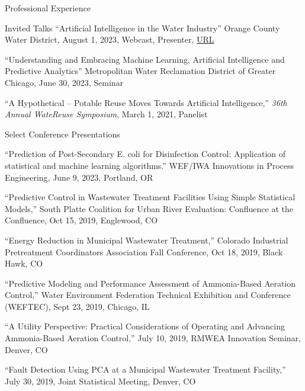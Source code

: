 \documentclass{resume} %
\begin{document}
\begin{rSection}{Professional Experience}
\begin{rSection}{Invited Talks}
``Artificial Intelligence in the Water Industry'' Orange County Water District, August 1, 2023, Webcast, Presenter, \href{https://www.youtube.com/watch?v=M3AQTs5iN5g&list=PLUMrNJO9gBM-7WWzJmBveXSQWbOXrLBDg}{URL}

``Understanding and Embracing Machine Learning, Artificial Intelligence and Predictive Analytics'' Metropolitan Water Reclamation District of Greater Chicago, June 30, 2023, Seminar

``A Hypothetical – Potable Reuse Moves Towards Artificial Intelligence,'' \emph{36th Annual WateReuse Symposium}, March 1, 2021, Panelist

\end{rSection}



\begin{rSection}{Select Conference Presentations}

``Prediction of Post-Secondary E. coli for Disinfection Control: Application of statistical and machine learning algorithms.'' WEF/IWA Innovations in Process Engineering, June 9, 2023, Portland, OR

``Predictive Control in Wastewater Treatment Facilities Using Simple Statistical Models,'' South Platte Coalition for Urban River Evaluation: Confluence at the Confluence, Oct 15, 2019, Englewood, CO

``Energy Reduction in Municipal Wastewater Treatment,'' Colorado Industrial Pretreatment Coordinators Association Fall Conference, Oct 18, 2019, Black Hawk, CO

%
``Predictive Modeling and Performance Assessment of Ammonia-Based Aeration Control,'' Water Environment Federation Technical Exhibition and Conference (WEFTEC), Sept 23, 2019, Chicago, IL

``A Utility Perspective: Practical Considerations of Operating and Advancing Ammonia-Based Aeration Control,'' July 10, 2019, RMWEA Innovation Seminar, Denver, CO

``Fault Detection Using PCA at a Municipal Wastewater Treatment Facility,'' July 30, 2019, Joint Statistical Meeting, Denver, CO


\end{rSection}
\end{rSection}
\end{document}
